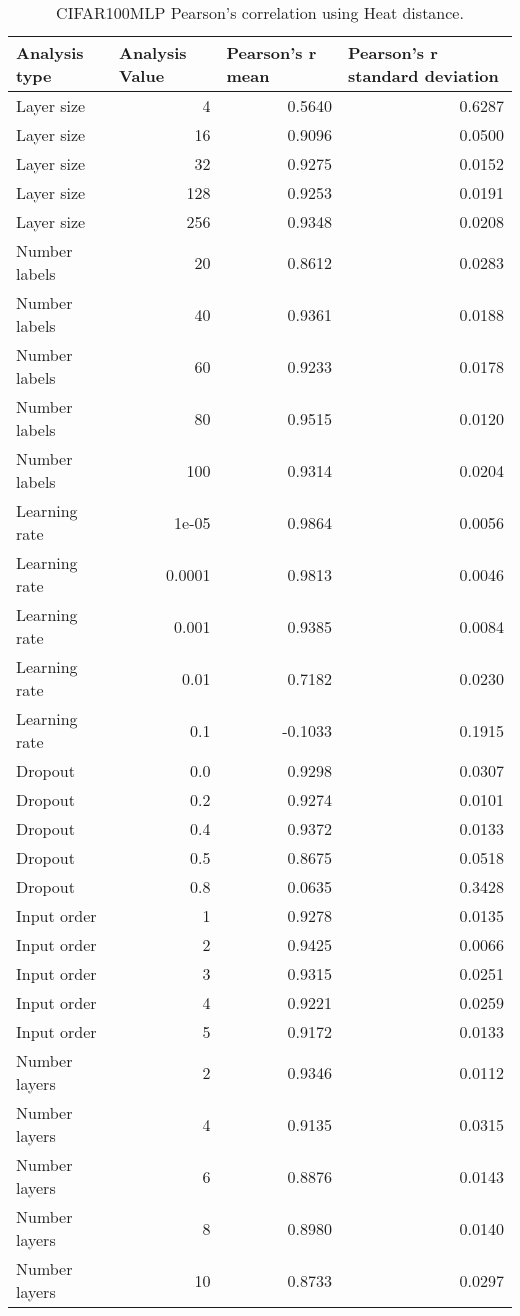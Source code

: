 \documentclass{article}
\begin{document}
\begin{table}[H]
\centering
\begin{tabular}{@{}lrrr@{}}
\toprule
Analysis type & \multicolumn{1}{l}{Analysis Value} & \multicolumn{1}{l}{Pearson's r mean} & \multicolumn{1}{l}{Pearson's r standard deviation} \\ \midrule
Layer size & 4 & 0.5640 & 0.6287 \\ 
Layer size & 16 & 0.9096 & 0.0500 \\ 
Layer size & 32 & 0.9275 & 0.0152 \\ 
Layer size & 128 & 0.9253 & 0.0191 \\ 
Layer size & 256 & 0.9348 & 0.0208 \\ 
Number labels & 20 & 0.8612 & 0.0283 \\ 
Number labels & 40 & 0.9361 & 0.0188 \\ 
Number labels & 60 & 0.9233 & 0.0178 \\ 
Number labels & 80 & 0.9515 & 0.0120 \\ 
Number labels & 100 & 0.9314 & 0.0204 \\ 
Learning rate & 1e-05 & 0.9864 & 0.0056 \\ 
Learning rate & 0.0001 & 0.9813 & 0.0046 \\ 
Learning rate & 0.001 & 0.9385 & 0.0084 \\ 
Learning rate & 0.01 & 0.7182 & 0.0230 \\ 
Learning rate & 0.1 & -0.1033 & 0.1915 \\ 
Dropout & 0.0 & 0.9298 & 0.0307 \\ 
Dropout & 0.2 & 0.9274 & 0.0101 \\ 
Dropout & 0.4 & 0.9372 & 0.0133 \\ 
Dropout & 0.5 & 0.8675 & 0.0518 \\ 
Dropout & 0.8 & 0.0635 & 0.3428 \\ 
Input order & 1 & 0.9278 & 0.0135 \\ 
Input order & 2 & 0.9425 & 0.0066 \\ 
Input order & 3 & 0.9315 & 0.0251 \\ 
Input order & 4 & 0.9221 & 0.0259 \\ 
Input order & 5 & 0.9172 & 0.0133 \\ 
Number layers & 2 & 0.9346 & 0.0112 \\ 
Number layers & 4 & 0.9135 & 0.0315 \\ 
Number layers & 6 & 0.8876 & 0.0143 \\ 
Number layers & 8 & 0.8980 & 0.0140 \\ 
Number layers & 10 & 0.8733 & 0.0297 \\ 
\bottomrule
\end{tabular}
\caption{CIFAR100MLP Pearson's correlation using Heat distance.}
\end{table}
\end{document}
